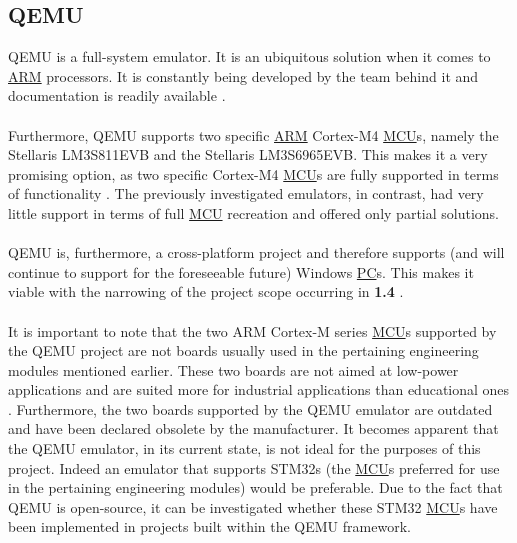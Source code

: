\subsection{QEMU}
\label{qemu}
QEMU is a full-system emulator. It is an ubiquitous solution when it comes to \hyperref[listAbr]{ARM} processors. It is constantly being developed by the team behind it and documentation is readily available \cite{QEMU}.
\\\\
Furthermore, QEMU supports two specific \hyperref[listAbr]{ARM} Cortex-M4  \hyperref[listAbr]{MCU}s, namely the Stellaris LM3S811EVB and the Stellaris LM3S6965EVB. This makes it a very promising option, as two specific Cortex-M4 \hyperref[listAbr]{MCU}s are fully supported in terms of functionality \cite{QEMU}\cite{QEMUarm}. The previously investigated emulators, in contrast, had very little support in terms of full \hyperref[listAbr]{MCU} recreation and offered only partial solutions.
\\\\
QEMU is, furthermore, a cross-platform project and therefore supports (and will continue to support for the foreseeable future) Windows \hyperref[listAbr]{PC}s. This makes it viable with the narrowing of the project scope occurring in \textbf{1.4 }. 
\\\\
It is important to note that the two ARM Cortex-M series \hyperref[listAbr]{MCU}s supported by the QEMU project are not boards usually used in the pertaining engineering modules mentioned earlier. These two boards are not aimed at low-power applications and are suited more for industrial applications than educational ones \cite{TexasInstruments2014}. Furthermore, the two boards supported by the QEMU emulator are outdated and have been declared obsolete by the manufacturer. It becomes apparent that the QEMU emulator, in its current state, is not ideal for the purposes of this project. Indeed an emulator that supports STM32s (the \hyperref[listAbr]{MCU}s preferred for use in the pertaining engineering modules) would be preferable. Due to the fact that QEMU is open-source, it can be investigated whether these STM32 \hyperref[listAbr]{MCU}s have been implemented in projects built within the QEMU framework.

